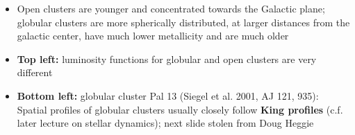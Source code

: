 \documentclass[letterpaper,landscape]{slides}
\begin{document}
\begin{slide}
{\begin{minipage}[t]{13cm}
\begin{itemize}
\item Open clusters are younger and concentrated towards the Galactic plane;
      globular clusters are more spherically distributed, at larger distances
      from the galactic center, have much lower metallicity and are much older
\item {\bf Top left:} luminosity functions for globular and open clusters 
       are very different 
\item {\bf Bottom left:} globular cluster Pal 13 (Siegel et al. 2001, 
      AJ 121, 935): Spatial profiles of globular clusters usually closely 
      follow {\bf King profiles} (c.f. later lecture on stellar dynamics);
      next slide stolen from Doug Heggie
\end{itemize}

\end{minipage}}
\vfill 
\end{slide}

\end{document}
